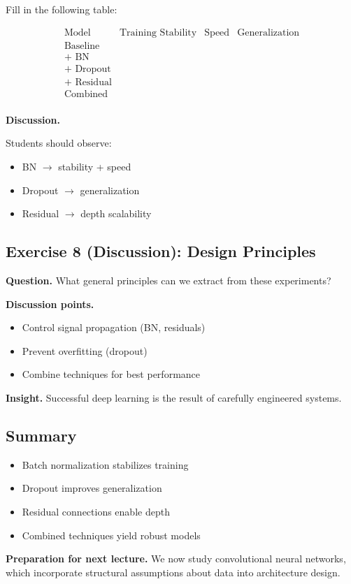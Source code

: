 Fill in the following table:

\[
\begin{array}{c|c|c|c}
\text{Model} & \text{Training Stability} & \text{Speed} & \text{Generalization} \\
\hline
\text{Baseline} & & & \\
\text{+ BN} & & & \\
\text{+ Dropout} & & & \\
\text{+ Residual} & & & \\
\text{Combined} & & & \\
\end{array}
\]

\medskip

\noindent
\textbf{Discussion.}

Students should observe:

\begin{itemize}
    \item BN $\rightarrow$ stability + speed
    \item Dropout $\rightarrow$ generalization
    \item Residual $\rightarrow$ depth scalability
\end{itemize}

\subsection{Exercise 8 (Discussion): Design Principles}

\textbf{Question.}  
What general principles can we extract from these experiments?

\medskip

\noindent
\textbf{Discussion points.}

\begin{itemize}
    \item Control signal propagation (BN, residuals)
    \item Prevent overfitting (dropout)
    \item Combine techniques for best performance
\end{itemize}

\medskip

\noindent
\textbf{Insight.}  
Successful deep learning is the result of carefully engineered systems.

\subsection{Summary}

\begin{itemize}
    \item Batch normalization stabilizes training
    \item Dropout improves generalization
    \item Residual connections enable depth
    \item Combined techniques yield robust models
\end{itemize}

\medskip

\noindent
\textbf{Preparation for next lecture.}  
We now study convolutional neural networks, which incorporate structural assumptions about data into architecture design.